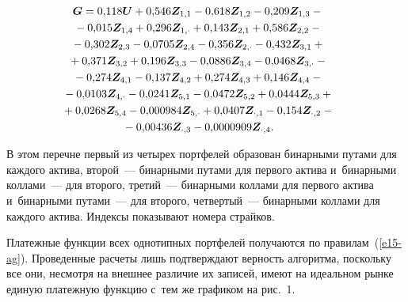 \begin{multicols}{2}
\begin{itemize}
\noindent
 \begin{multline*}
  \hspace*{-13pt}\boldsymbol{G} = 0{,}118\boldsymbol{U} + 0{,}546 \boldsymbol{Z}_{1,1} - 0{,}618 \boldsymbol{Z}_{1,2} - 
0{,}209 \boldsymbol{Z}_{1,3} - {}\\
  \hspace*{-13pt}{}- 0{,}015 \boldsymbol{Z}_{1,4} + 0{,}296 \boldsymbol{Z}_{1,\cdot} + 0{,}143 \boldsymbol{Z}_{2,1} + 0{,}586 \boldsymbol{Z}_{2,2} -{}\\
  \hspace*{-13pt}{}- 0{,}302 \boldsymbol{Z}_{2,3} - 0{,}0705 \boldsymbol{Z}_{2,4} - 0{,}356 \boldsymbol{Z}_{2,\cdot} - 0{,}432 \boldsymbol{Z}_{3,1} + {}\\
  \hspace*{-13pt}{}+ 0{,}371 \boldsymbol{Z}_{3,2} + 0{,}196 \boldsymbol{Z}_{3,3} - 0{,}0886 \boldsymbol{Z}_{3,4} - 0{,}0468 \boldsymbol{Z}_{3,\cdot} -{}\\
  \hspace*{-13pt}{}- 0{,}274 \boldsymbol{Z}_{4,1} - 0{,}137 \boldsymbol{Z}_{4,2} + 0{,}274 \boldsymbol{Z}_{4,3} + 0{,}146 \boldsymbol{Z}_{4,4} -{}\\
  \hspace*{-13pt}{}- 0{,}0103\boldsymbol{Z}_{4,\cdot} - 0{,}0241 \boldsymbol{Z}_{5,1} - 0{,}0472 \boldsymbol{Z}_{5,2} + 0{,}0444 \boldsymbol{Z}_{5,3} + {}\\
  \hspace*{-13pt}{}+0{,}0268 \boldsymbol{Z}_{5,4} - 0{,}000984 \boldsymbol{Z}_{5,\cdot} + 0{,}0407 \boldsymbol{Z}_{\cdot,1} - 
0{,}154 \boldsymbol{Z}_{\cdot,2} - {}\\
  \hspace*{-13pt}{}- 0{,}00436\boldsymbol{Z}_{\cdot,3} - 0{,}0000909 \boldsymbol{Z}_{\cdot,4}. 
\end{multline*}
\end{itemize}

\vspace*{-3pt}
  
  В этом перечне первый из четырех портфелей образован бинарными путами 
для каждого актива, второй~--- бинарными путами для первого актива 
и~бинарными коллами~--- для второго, третий~--- бинарными коллами для 
первого актива и~бинарными путами~--- для второго, четвертый~--- бинарными 
коллами для каждого актива. Индексы показывают номера страйков.


  
  Платежные функции всех однотипных портфелей получаются по 
правилам~(\ref{e15-ag}). Проведенные
расчеты лишь подтверждают верность 
алгоритма, поскольку все они, несмотря на внешнее различие их записей, 
имеют на идеальном рынке единую платежную функцию с~тем же графиком на 
рис.~1. 
  

\end{multicols}
